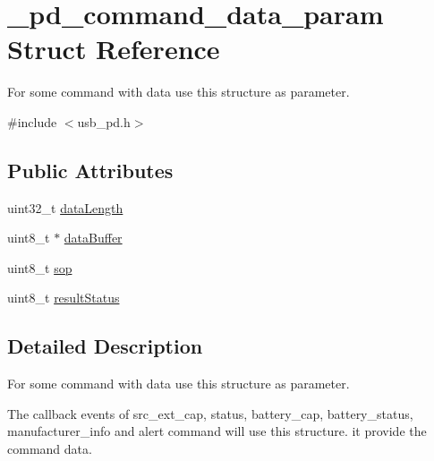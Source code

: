 \hypertarget{struct__pd__command__data__param}{\section{\-\_\-pd\-\_\-command\-\_\-data\-\_\-param Struct Reference}
\label{struct__pd__command__data__param}
}


For some command with data use this structure as parameter.  




{\ttfamily \#include $<$usb\-\_\-pd.\-h$>$}

\subsection*{Public Attributes}
\begin{DoxyCompactItemize}
\item 
uint32\-\_\-t \hyperlink{struct__pd__command__data__param_a1ebd3619e990184cbc131f98137e3447}{data\-Length}
\item 
uint8\-\_\-t $\ast$ \hyperlink{struct__pd__command__data__param_a208a0a5b69c2c44eaa616e4e1d6b77ee}{data\-Buffer}
\item 
uint8\-\_\-t \hyperlink{struct__pd__command__data__param_abc162486c37792c444d2ea46da2c27ed}{sop}
\item 
uint8\-\_\-t \hyperlink{struct__pd__command__data__param_ae615100fed31d9a3b0d14df3e88b427f}{result\-Status}
\end{DoxyCompactItemize}


\subsection{Detailed Description}
For some command with data use this structure as parameter. 

The callback events of src\-\_\-ext\-\_\-cap, status, battery\-\_\-cap, battery\-\_\-status, manufacturer\-\_\-info and alert command will use this structure. it provide the command data. 

